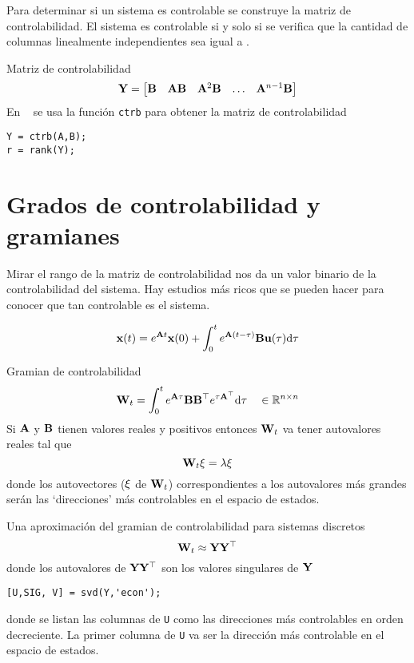 \documentclass[11pt, a4paper, twoside, openright, openany]{book}
\newcommand{\dimss}{\dimfont{n}}
\begin{document}
Para determinar si un sistema es controlable se construye la matriz de controlabilidad. El sistema es controlable si y solo si se verifica que la cantidad de columnas linealmente independientes sea igual a \dimss. 
\begin{definition}{Matriz de controlabilidad}
\[
\ctrb = \begin{bmatrix}
\MB & \MA \MB & \MA^2 \MB & \ldots & \MA^{\dimss-1}\MB 
\end{bmatrix}
\]	
En \Matlab~ se usa la función \texttt{ctrb} para obtener la matriz de controlabilidad
\begin{lstlisting}[caption={Obtención del rango de \(\ctrb\)}]
Y = ctrb(A,B);
r = rank(Y);
\end{lstlisting}
\end{definition}

\section{Grados de controlabilidad y gramianes}
Mirar el rango de la matriz de controlabilidad nos da un valor binario de la controlabilidad del sistema. Hay estudios más ricos que se pueden hacer para conocer que tan controlable es el sistema.


\[
\mathbf{x} (t) = e^{\mathbf{A} t} \mathbf{x}(0) + \int_0^t e^{\mathbf{A}(t-\tau)} \mathbf{B} \mathbf{u}(\tau) \textrm{d} \tau
\]

\begin{definition}{Gramian de controlabilidad}
\[
\MW_t = \int_0^t e^{\MA\tau} \MB \MB\tp e^{\tau\MA\tp } \di \tau  \quad \in \mathbb{R}^{\dimss\times\dimss}
	\]
Si $\mathbf{A}$ y $\mathbf{B}$ tienen valores reales y positivos entonces $\mathbf{W}_t$ va tener autovalores reales tal que 
\[
\mathbf{W}_t \mathbf{\xi} = \lambda \mathbf{\xi}
\]
donde los autovectores ($\mathbf{\xi}$ de $\mathbf{W}_t$) correspondientes a los autovalores más grandes serán las `direcciones' más controlables en el espacio de estados. 
\end{definition}

Una aproximación del gramian de controlabilidad para sistemas discretos
\[
\mathbf{W}_t \approx \mathbf{Y} \mathbf{Y}^{\top}
\]
donde los autovalores de $\mathbf{Y}\mathbf{Y}^{\top}$ son los valores singulares 	de $\mathbf{Y}$


\begin{lstlisting}
[U,SIG, V] = svd(Y,'econ');
\end{lstlisting}
donde se listan las columnas de \texttt{U} como las direcciones más controlables en orden decreciente. La primer columna de \texttt{U} va ser la dirección más controlable en el espacio de estados. 
\end{document}
